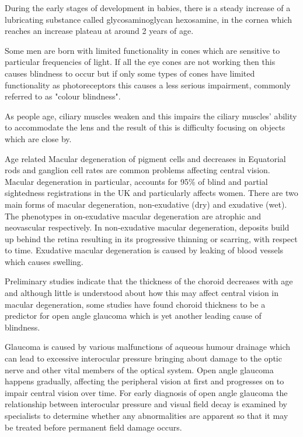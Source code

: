 During the early stages of development in babies, there is a steady
increase of a lubricating substance called glycosaminoglycan hexosamine,
in the cornea which reaches an increase plateau at around 2 years of age.
\cite{praus1975glycosaminoglycans}

Some men are born with limited functionality in cones which are
sensitive to particular frequencies of light.\cite{george1996clinical}
If all the eye cones are not working then this causes blindness
to occur but if only some types of cones have limited functionality
as photoreceptors this causes a less serious impairment, commonly
referred to as "colour blindness".

As people age, ciliary muscles weaken and this impairs the ciliary
muscles' ability to accommodate the lens and the result of this is
difficulty focusing on objects which are close by.
\cite{fisher1985ciliary}

Age related Macular degeneration of pigment cells and decreases in
Equatorial rods and ganglion cell rates are common problems affecting
central vision.\cite{gao1992aging} Macular degeneration in particular,
accounts for 95\% of blind and partial sightedness registrations in the
UK and particularly affects women.\cite{o1998age,klein2005complement}
There are two main forms of macular degeneration, non-exudative (dry)
and exudative (wet). The phenotypes in on-exudative macular degeneration
are atrophic and neovascular respectively.\cite{kuno2011dry} In
non-exudative macular degeneration, deposits build up behind the retina
resulting in its progressive thinning or scarring, with respect to time.
Exudative macular degeneration is caused by leaking of blood vessels
which causes swelling.

Preliminary studies indicate that the thickness of the choroid decreases
with age and although little is understood about how this may affect
central vision in macular degeneration, some studies have found
choroid thickness to be a predictor for open angle glaucoma which
is yet another leading cause of blindness.
\cite{margolis2009pilot,gordon2002ocular}

Glaucoma is caused by various malfunctions of aqueous humour drainage
which can lead to excessive interocular pressure bringing about damage
to the optic nerve and other vital members of the optical system.
\cite{distelhorst2003open} Open angle glaucoma happens gradually,
affecting the peripheral vision at first and progresses on to impair
central vision over time. For early diagnosis of open angle glaucoma
the relationship between interocular pressure and visual field decay
is examined by specialists to determine whether any abnormalities are
apparent so that it may be treated before permanent field damage occurs.
\cite{goldmann1972open}

